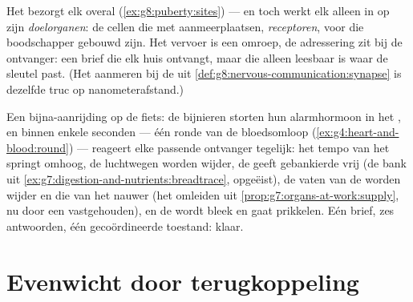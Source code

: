 \begin{proposition}\label{prop:g8:hormonal-communication:address}
Het  bezorgt elk  overal
(\cref{ex:g8:puberty:sites}) --- en toch werkt elk  alleen in op
zijn \emph{doelorganen}: de cellen die met
aanmeerplaatsen, \emph{receptoren}, voor die boodschapper gebouwd zijn. Het
vervoer is een omroep, de adressering zit bij de ontvanger: een brief die
elk huis ontvangt, maar die alleen leesbaar is waar de sleutel past. (Het
aanmeren bij de  uit
\cref{def:g8:nervous-communication:synapse} is dezelfde truc op
nanometerafstand.)
\end{proposition}
\admitted

\begin{example}\label{ex:g8:hormonal-communication:alarm}
Een bijna-aanrijding op de fiets: de bijnieren storten hun alarmhormoon in
het , en binnen enkele seconden --- één ronde van de bloedsomloop
(\cref{ex:g4:heart-and-blood:round}) --- reageert elke passende ontvanger
tegelijk: het tempo van het  springt omhoog, de luchtwegen worden
wijder, de  geeft gebankierde  vrij (de bank uit
\cref{ex:g7:digestion-and-nutrients:breadtrace}, opgeëist), de vaten van de
 worden wijder en die van het  nauwer (het
omleiden uit \cref{prop:g7:organs-at-work:supply}, nu door een 
vastgehouden), en de  wordt bleek en gaat prikkelen. Eén brief, zes
antwoorden, één gecoördineerde toestand: klaar.
\end{example}

\section{Evenwicht door terugkoppeling}

